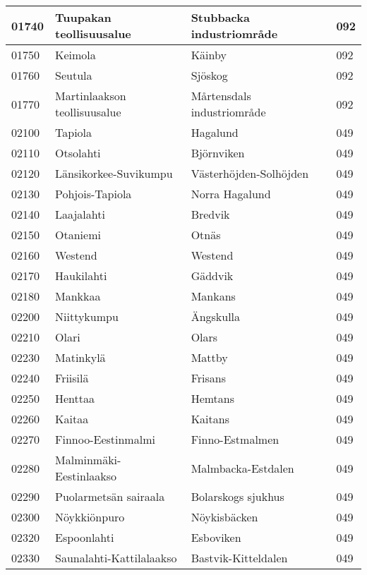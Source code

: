 \begin{center}
\begin{longtable}{|l l l l|}
        01740 & Tuupakan teollisuusalue & Stubbacka industriområde & 092 \\ [0.25ex] \hline
        01750 & Keimola & Käinby & 092 \\ [0.25ex] \hline
        01760 & Seutula & Sjöskog & 092 \\ [0.25ex] \hline
        01770 & Martinlaakson teollisuusalue & Mårtensdals industriområde & 092 \\ [0.25ex] \hline
        02100 & Tapiola & Hagalund & 049 \\ [0.25ex] \hline
        02110 & Otsolahti & Björnviken & 049 \\ [0.25ex] \hline
        02120 & Länsikorkee-Suvikumpu & Västerhöjden-Solhöjden & 049 \\ [0.25ex] \hline
        02130 & Pohjois-Tapiola & Norra Hagalund & 049 \\ [0.25ex] \hline
        02140 & Laajalahti & Bredvik & 049 \\ [0.25ex] \hline
        02150 & Otaniemi & Otnäs & 049 \\ [0.25ex] \hline
        02160 & Westend & Westend & 049 \\ [0.25ex] \hline
        02170 & Haukilahti & Gäddvik & 049 \\ [0.25ex] \hline
        02180 & Mankkaa & Mankans & 049 \\ [0.25ex] \hline
        02200 & Niittykumpu & Ängskulla & 049 \\ [0.25ex] \hline
        02210 & Olari & Olars & 049 \\ [0.25ex] \hline
        02230 & Matinkylä & Mattby & 049 \\ [0.25ex] \hline
        02240 & Friisilä & Frisans & 049 \\ [0.25ex] \hline
        02250 & Henttaa & Hemtans & 049 \\ [0.25ex] \hline
        02260 & Kaitaa & Kaitans & 049 \\ [0.25ex] \hline
        02270 & Finnoo-Eestinmalmi & Finno-Estmalmen & 049 \\ [0.25ex] \hline
        02280 & Malminmäki-Eestinlaakso & Malmbacka-Estdalen & 049 \\ [0.25ex] \hline
        02290 & Puolarmetsän sairaala & Bolarskogs sjukhus & 049 \\ [0.25ex] \hline
        02300 & Nöykkiönpuro & Nöykisbäcken & 049 \\ [0.25ex] \hline
        02320 & Espoonlahti & Esboviken & 049 \\ [0.25ex] \hline
        02330 & Saunalahti-Kattilalaakso & Bastvik-Kitteldalen & 049 \\ [0.25ex] \hline

\end{longtable}
\end{center}
